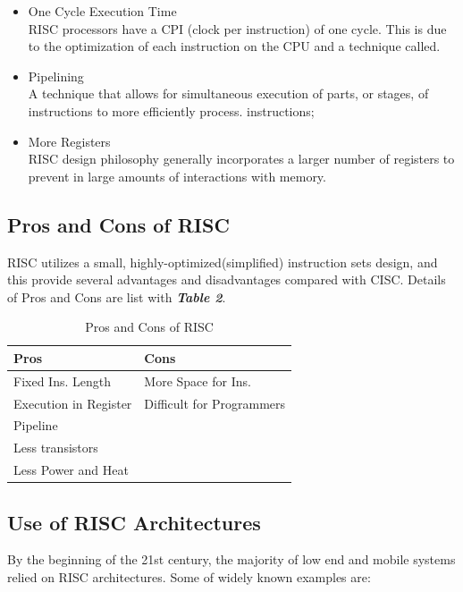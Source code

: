 \documentclass[conference]{IEEEtran}
\begin{document}
\begin{itemize} 
\item{One Cycle Execution Time}
\\RISC processors have a CPI (clock per instruction) of one cycle. This is due to the optimization of each instruction on the CPU and a technique called.
\item{Pipelining}
 \\A technique that allows for simultaneous execution of parts, or stages, of instructions to more efficiently process. instructions;
\item{More Registers}
\\RISC design philosophy generally incorporates a larger number of registers to prevent in large amounts of interactions with memory.
\end{itemize}


\subsection{Pros and Cons of RISC}
RISC utilizes a small, highly-optimized(simplified) instruction sets design, and this provide several advantages and disadvantages compared with CISC. Details of Pros and Cons are list with  \textit{\textbf{Table 2}}.

\begin{table}[h]
\centering
\caption{Pros and Cons of RISC}
\label{pro-con}
\begin{tabular}{ll}
\hline
Pros & Cons \\ \hline
Fixed Ins. Length & More Space for Ins. \\
Execution in Register & Difficult for Programmers\\
Pipeline & \\
Less transistors & \\ 
Less Power and Heat & \\ \hline
\end{tabular}
\end{table}


\subsection{Use of RISC Architectures}
By the beginning of the 21st century, the majority of low end and mobile systems relied on RISC architectures. Some of widely known examples are:
\end{document}
